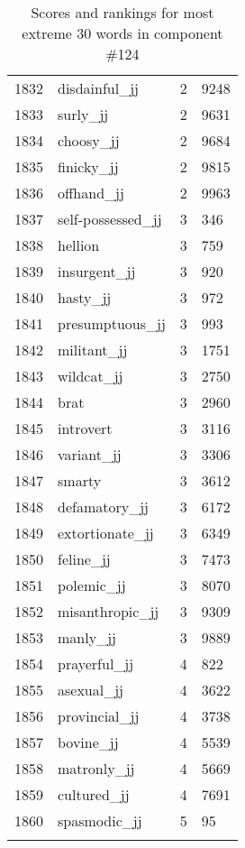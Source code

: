 \begin{longtable}[!htbp]{| rlr@{.}l |}
    1832 & disdainful\_jj & 2 & 9248 \\
    1833 & surly\_jj & 2 & 9631 \\
    1834 & choosy\_jj & 2 & 9684 \\
    1835 & finicky\_jj & 2 & 9815 \\
    1836 & offhand\_jj & 2 & 9963 \\
    1837 & self-possessed\_jj & 3 & 346 \\
    1838 & hellion & 3 & 759 \\
    1839 & insurgent\_jj & 3 & 920 \\
    1840 & hasty\_jj & 3 & 972 \\
    1841 & presumptuous\_jj & 3 & 993 \\
    1842 & militant\_jj & 3 & 1751 \\
    1843 & wildcat\_jj & 3 & 2750 \\
    1844 & brat & 3 & 2960 \\
    1845 & introvert & 3 & 3116 \\
    1846 & variant\_jj & 3 & 3306 \\
    1847 & smarty & 3 & 3612 \\
    1848 & defamatory\_jj & 3 & 6172 \\
    1849 & extortionate\_jj & 3 & 6349 \\
    1850 & feline\_jj & 3 & 7473 \\
    1851 & polemic\_jj & 3 & 8070 \\
    1852 & misanthropic\_jj & 3 & 9309 \\
    1853 & manly\_jj & 3 & 9889 \\
    1854 & prayerful\_jj & 4 & 822 \\
    1855 & asexual\_jj & 4 & 3622 \\
    1856 & provincial\_jj & 4 & 3738 \\
    1857 & bovine\_jj & 4 & 5539 \\
    1858 & matronly\_jj & 4 & 5669 \\
    1859 & cultured\_jj & 4 & 7691 \\
    1860 & spasmodic\_jj & 5 & 95 \\
    \hline
    \caption{Scores and rankings for most extreme 30 words in component \#124} \\
\end{longtable}
